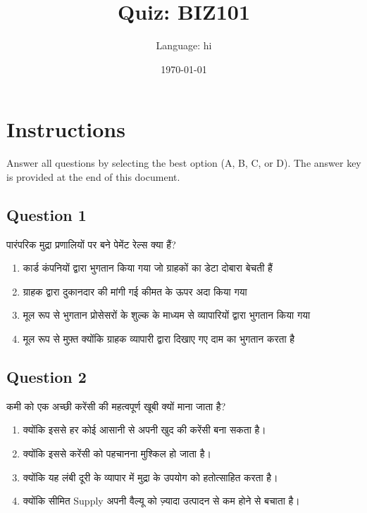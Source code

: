 \documentclass[12pt,a4paper]{article}
\title{Quiz: BIZ101}
\author{Language: hi}
\date{\today}
\begin{document}
\maketitle
\thispagestyle{fancy}

\section*{Instructions}
Answer all questions by selecting the best option (A, B, C, or D). The answer key is provided at the end of this document.

\bigskip


\subsection*{Question 1}
पारंपरिक मुद्रा प्रणालियों पर बने पेमेंट रेल्स क्या हैं?

\begin{enumerate}[label=\Alph*., leftmargin=*]
\item कार्ड कंपनियों द्वारा भुगतान किया गया जो ग्राहकों का डेटा दोबारा बेचती हैं
\item ग्राहक द्वारा दुकानदार की मांगी गई कीमत के ऊपर अदा किया गया
\item मूल रूप से भुगतान प्रोसेसरों के शुल्क के माध्यम से व्यापारियों द्वारा भुगतान किया गया
\item मूल रूप से मुफ़्त क्योंकि ग्राहक व्यापारी द्वारा दिखाए गए दाम का भुगतान करता है
\end{enumerate}

\bigskip


\subsection*{Question 2}
कमी को एक अच्छी करेंसी की महत्वपूर्ण खूबी क्यों माना जाता है?

\begin{enumerate}[label=\Alph*., leftmargin=*]
\item क्योंकि इससे हर कोई आसानी से अपनी खुद की करेंसी बना सकता है।
\item क्योंकि इससे करेंसी को पहचानना मुश्किल हो जाता है।
\item क्योंकि यह लंबी दूरी के व्यापार में मुद्रा के उपयोग को हतोत्साहित करता है।
\item क्योंकि सीमित Supply अपनी वैल्यू को ज़्यादा उत्पादन से कम होने से बचाता है।
\end{enumerate}

\bigskip
\end{document}
